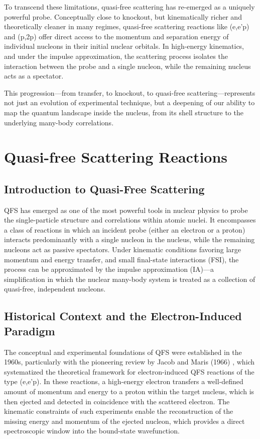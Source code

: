 To transcend these limitations, quasi-free scattering has re-emerged as a uniquely powerful probe. Conceptually close to knockout, but kinematically richer and theoretically cleaner in many regimes, quasi-free scattering reactions like (e,e'p) and (p,2p) offer direct access to the momentum and separation energy of individual nucleons in their initial nuclear orbitals. In high-energy kinematics, and under the impulse approximation, the scattering process isolates the interaction between the probe and a single nucleon, while the remaining nucleus acts as a spectator.

This progression—from transfer, to knockout, to quasi-free scattering—represents not just an evolution of experimental technique, but a deepening of our ability to map the quantum landscape inside the nucleus, from its shell structure to the underlying many-body correlations.


\section{Quasi-free Scattering Reactions}

\subsection{Introduction to Quasi-Free Scattering}

\gls{QFS} has emerged as one of the most powerful tools in nuclear physics to probe the single-particle structure and correlations within atomic nuclei. It encompasses a class of reactions in which an incident probe (either an electron or a proton) interacts predominantly with a single nucleon in the nucleus, while the remaining nucleons act as passive spectators. Under kinematic conditions favoring large momentum and energy transfer, and small final-state interactions (FSI), the process can be approximated by the impulse approximation (IA)—a simplification in which the nuclear many-body system is treated as a collection of quasi-free, independent nucleons.

\subsection{Historical Context and the Electron-Induced Paradigm}

The conceptual and experimental foundations of \gls{QFS} were established in the 1960s, particularly with the pioneering review by Jacob and Maris (1966) \cite{jacob_quasi-free_1966}, which systematized the theoretical framework for electron-induced \gls{QFS} reactions of the type (e,e'p). In these reactions, a high-energy electron transfers a well-defined amount of momentum and energy to a proton within the target nucleus, which is then ejected and detected in coincidence with the scattered electron. The kinematic constraints of such experiments enable the reconstruction of the missing energy and momentum of the ejected nucleon, which provides a direct spectroscopic window into the bound-state wavefunction.

